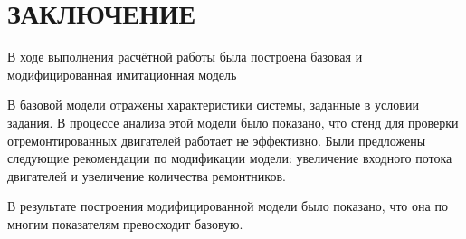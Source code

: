 \section*{ЗАКЛЮЧЕНИЕ}

В ходе выполнения расчётной работы была построена базовая и модифицированная
имитационная модель

В базовой модели отражены характеристики системы, заданные в условии задания.
В процессе анализа этой модели было показано, что стенд для проверки
отремонтированных двигателей работает не эффективно. Были предложены
следующие рекомендации по модификации модели: увеличение входного
потока двигателей и увеличение количества ремонтников.

В результате построения модифицированной модели было показано, что она по
многим показателям превосходит базовую.

\pagebreak
